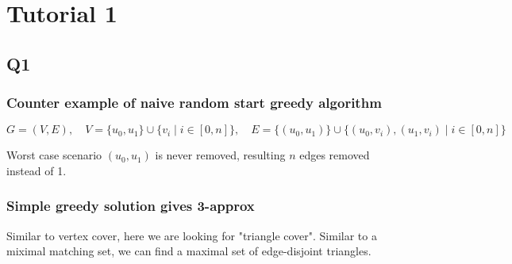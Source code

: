 \documentclass[10pt]{article}
\theoremstyle{definition}
\begin{document}
\section*{Tutorial 1}
\subsection*{Q1}
\subsubsection*{Counter example of naive random start greedy algorithm}
\[G = (V, E), \quad V = \{u_0, u_1\} \cup \{v_i \mid i \in [0, n]\}, \quad E = \{(u_0, u_1)\} \cup \{(u_0, v_i), (u_1, v_i) \mid i \in [0, n]\}\]


Worst case scenario $(u_0, u_1)$ is never removed, resulting $n$ edges removed instead of 1.

\subsubsection*{Simple greedy solution gives 3-approx}
Similar to vertex cover, here we are looking for "triangle cover". Similar to a miximal matching set, we can 
find a maximal set of edge-disjoint triangles. 
\end{document}
